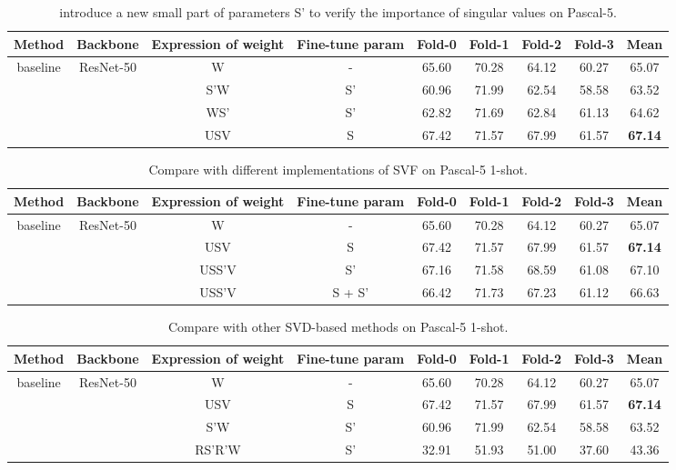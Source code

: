 \documentclass{article}
\begin{document}
\begin{table}[]\scriptsize
\centering
\renewcommand\arraystretch{1.1}
\caption{introduce a new small part of parameters S' to verify the importance of singular values on Pascal-5.}
\label{tab:about_s}
\begin{tabular}{c|c|c|c|cccc|c}
\hline
Method & Backbone& Expression of weight& Fine-tune param & Fold-0 & Fold-1 & Fold-2 & Fold-3 & Mean  \\ \hline
\multirow{4}{*}{baseline} & \multirow{4}{*}{ResNet-50}  &W &- & 65.60 & 70.28 & 64.12 & 60.27 & 65.07 \\
 & & S'W&S' & 60.96  & 71.99  & 62.54  & 58.58  & 63.52 \\
 &               & WS' &S'&	62.82&	71.69&	62.84&	61.13&	64.62 \\  
  &              & USV &S	&67.42	&71.57&	67.99&	61.57&	\textbf{67.14} \\ 
  \hline 
\end{tabular}
\end{table}

\begin{table}[]\scriptsize
\centering
\renewcommand\arraystretch{1.1}
\caption{Compare with different implementations of SVF on Pascal-5 1-shot.}
\label{tab:diff_s}
\begin{tabular}{c|c|c|c|cccc|c}
\hline
Method & Backbone& Expression of weight& Fine-tune param & Fold-0 & Fold-1 & Fold-2 & Fold-3 & Mean  \\ \hline
\multirow{4}{*}{baseline} & \multirow{4}{*}{ResNet-50}  &W &- & 65.60 & 70.28 & 64.12 & 60.27 & 65.07 \\
&              & USV &S	&67.42	&71.57&	67.99&	61.57&	\textbf{67.14} \\
&              & USS'V &S'	&67.16	&71.58&	68.59&	61.08&	67.10 \\
&              & USS'V &S + S'	&66.42	&71.73&	67.23&	61.12&	66.63 \\
   
  \hline 
\end{tabular}
\end{table}

\begin{table}[]\scriptsize
\centering
\renewcommand\arraystretch{1.1}
\caption{Compare with other SVD-based methods on Pascal-5 1-shot.}
\label{tab:rsrw}
\begin{tabular}{c|c|c|c|cccc|c}
\hline
Method & Backbone& Expression of weight& Fine-tune param & Fold-0 & Fold-1 & Fold-2 & Fold-3 & Mean  \\ \hline
\multirow{4}{*}{baseline} & \multirow{4}{*}{ResNet-50}  &W &- & 65.60 & 70.28 & 64.12 & 60.27 & 65.07 \\
&              & USV &S	&67.42	&71.57&	67.99&	61.57&	\textbf{67.14} \\
 & & S'W&S' & 60.96  & 71.99  & 62.54  & 58.58  & 63.52 \\
&              & RS'R'W & S'	&32.91	&51.93&	51.00&	37.60&	43.36 \\
   
  \hline 
\end{tabular}
\end{table}
\end{document}
